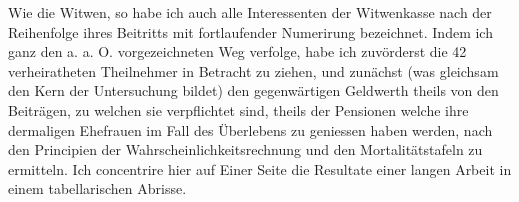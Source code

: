 \par{}\smallskip
Wie die Witwen, so habe ich auch alle Interessenten der Witwenkasse nach der Reihenfolge ihres Beitritts mit fortlaufender Numerirung bezeichnet. Indem ich ganz den a. a. O. vorgezeichneten Weg verfolge, habe ich zuvörderst die 42 verheiratheten Theilnehmer in Betracht zu ziehen, und zunächst (was gleichsam den Kern der Untersuchung bildet) den gegenwärtigen Geldwerth theils von den Beiträgen, zu welchen sie verpflichtet sind, theils der Pensionen welche ihre dermaligen Ehefrauen im Fall des Überlebens zu geniessen haben werden, nach den Principien der Wahrscheinlichkeitsrechnung und den Mortalitätstafeln zu ermitteln. Ich concentrire hier auf Einer Seite die Resultate einer langen Arbeit in einem tabellarischen Abrisse.

